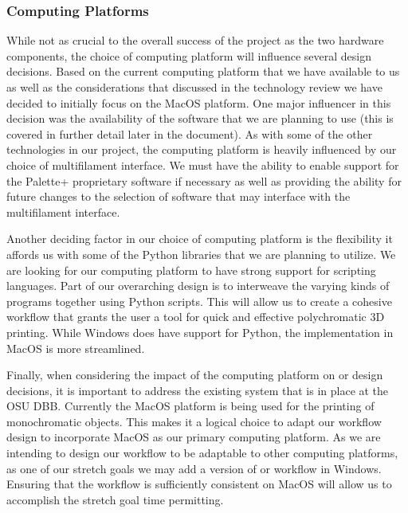 \documentclass[letterpaper, onecolumn, draftclsnofoot, 10pt, compsoc]{IEEEtran}
\begin{document}
\begin{singlespace}
        \subsubsection{Computing Platforms}
        While not as crucial to the overall success of the project as the two hardware components, the choice of computing platform will influence several design decisions. Based on the current computing platform that we have available to us as well as the considerations that discussed in the technology review we have decided to initially focus on the MacOS platform. One major influencer in this decision was the availability of the software that we are planning to use (this is covered in further detail later in the document). As with some of the other technologies in our project, the computing platform is heavily influenced by our choice of multifilament interface. We must have the ability to enable support for the Palette+ proprietary software if necessary as well as providing the ability for future changes to the selection of software that may interface with the multifilament interface.\par
        Another deciding factor in our choice of computing platform is the flexibility it affords us with some of the Python libraries that we are planning to utilize. We are looking for our computing platform to have strong support for scripting languages. Part of our overarching design is to interweave the varying kinds of programs together using Python scripts. This will allow us to create a cohesive workflow that grants the user a tool for quick and effective polychromatic 3D printing. While Windows does have support for Python, the implementation in MacOS is more streamlined.\par
Finally, when considering the impact of the computing platform on or design decisions, it is important to address the existing system that is in place at the OSU DBB. Currently the MacOS platform is being used for the printing of monochromatic objects. This makes it a logical choice to adapt our workflow design to incorporate MacOS as our primary computing platform. As we are intending to design our workflow to be adaptable to other computing platforms, as one of our stretch goals we may add a version of or workflow in Windows. Ensuring that the workflow is sufficiently consistent on MacOS will allow us to accomplish the stretch goal time permitting.\par


\end{singlespace}
\end{document}
